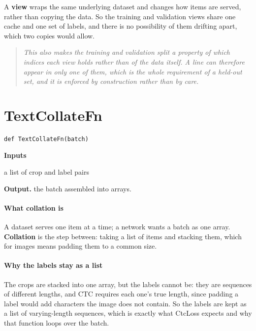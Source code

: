 A \textbf{view} wraps the same underlying dataset and changes how items are served, rather than copying the data. So the training and validation views share one cache and one set of labels, and there is no possibility of them drifting apart, which two copies would allow.


\begin{quote}\small\itshape This also makes the training and validation split a property of which indices each view holds rather than of the data itself. A line can therefore appear in only one of them, which is the whole requirement of a held-out set, and it is enforced by construction rather than by care.\end{quote}

\section{TextCollateFn}
\begin{lstlisting}[style=sig]
def TextCollateFn(batch)
\end{lstlisting}

\noindent\textbf{Inputs}
\begin{description}[leftmargin=2.2em,style=nextline,font=\normalfont\ttfamily]\setlength\itemsep{1pt}
  \item[{batch}] \normalfont a list of crop and label pairs
\end{description}

\noindent\textbf{Output.} the batch assembled into arrays.


\paragraph{What collation is}
A dataset serves one item at a time; a network wants a batch as one array. \textbf{Collation} is the step between: taking a list of items and stacking them, which for images means padding them to a common size.


\paragraph{Why the labels stay as a list}
The crops are stacked into one array, but the labels cannot be: they are sequences of different lengths, and CTC requires each one's true length, since padding a label would add characters the image does not contain. So the labels are kept as a list of varying-length sequences, which is exactly what CtcLoss expects and why that function loops over the batch.


